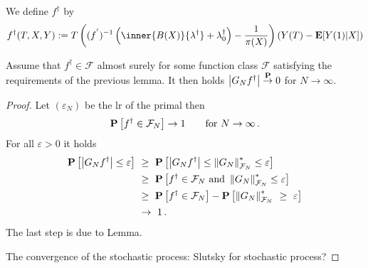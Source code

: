 We define $f^\dagger$ by
\begin{gather}
  f^\dagger(T,X,Y)
  :=
  T
  \left( 
    (f^{'})^{-1}
    \left( 
      \inner
      {B(X)}
      {\lambda^\dagger}
    +
    \lambda_0^\dagger
    \right)
    -
    \frac{1}{\pi(X)}
  \right)
  \left( 
    Y(T)
    -
    \E
    [
    Y(1)|X
    ]
  \right)
\end{gather}
\begin{lemma}
  Assume that 
  $f^\dagger \in \mathcal{F}$ almost surely 
  for some function class $\mathcal{F}$ satisfying the requirements 
  of the previous lemma. It then holds
  $
  \left| G_Nf^\dagger \right|
  \overset{\P}{\to}0$ for 
  $N\to\infty$.
\end{lemma}
\begin{proof}
  Let $(\varepsilon_N)$ be the lr of the primal
  then
  \begin{gather}
    \P
    \left[ 
      f^\dagger
      \in
      \mathcal{F}_N
    \right]
    \to 1
    \qquad
    \text{for}\ 
    N\to\infty
    \,.
  \end{gather}
  For all $\varepsilon>0$ it holds
  \begin{align*}
    \P
    \left[ 
  \left| G_Nf^\dagger \right|
  \le
  \varepsilon
    \right]
    &
    \ 
    \ge
    \ 
    \P
    \left[ 
  \left| G_Nf^\dagger \right|
  \le
  \norm{G_N}^*_{\mathcal{F}_N}
  \le
  \varepsilon
    \right]
    \\
    &
    \ 
    \ge
    \ 
    \P
    \left[ 
      f^\dagger\in\mathcal{F}_N
      \ 
      \text{and}\ 
  \norm{G_N}^*_{\mathcal{F}_N}
  \le
  \varepsilon
    \right]
    \\
    &
    \ 
    \ge
    \ 
    \P
    \left[ 
      f^\dagger\in\mathcal{F}_N
    \right]
    -
    \P
    \left[ 
  \norm{G_N}^*_{\mathcal{F}_N}
    \ 
  \ge
    \ 
  \varepsilon
    \right]
    \\
    &
    \ 
    \to
    \ 
    1
    \,.
  \end{align*}
  The last step is due to Lemma.

  The convergence of the stochastic process:
  \cite[Example~19.6]{Vaart2000}
  Slutsky for stochastic process?
\end{proof}

